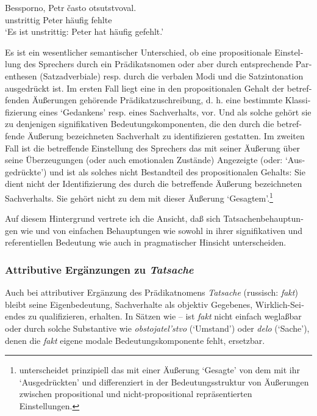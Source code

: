\documentclass[output=paper]{langscibook}
\begin{document}
\begin{otherlanguage}{german}
\begin{exe}
        
     \label{ex:zi83:34'}
        \gll Bessporno, Petr často otsutstvoval. \\
        unstrittig Peter häufig fehlte \\
        \glt ‘Es ist unstrittig: Peter hat häufig gefehlt.’
\end{exe}

\noindent Es ist ein wesentlicher semantischer Unterschied, ob eine propositionale Einstellung des Sprechers durch ein Prädikatsnomen oder aber durch entsprechende Parenthesen (Satzadverbiale) resp. durch die verbalen Modi und die Satzintonation ausgedrückt ist. Im ersten Fall liegt eine in den propositionalen Gehalt der betreffenden Äußerungen gehörende Prädikatzuschreibung, d. h. eine be\-stimm\-te Klassifizierung eines ‘Gedankens’ resp. eines Sachverhalts, vor. Und als solche gehört sie zu denjenigen signifikativen Bedeutungskomponenten, die den durch die betreffende Äußerung bezeichneten Sachverhalt zu identifizieren gestatten. Im zweiten Fall ist die betreffende Einstellung des Sprechers das mit seiner Äußerung über seine Überzeugungen (oder auch emotionalen Zustände) An\-ge\-zeig\-te (oder: ‘Ausgedrückte’) und ist als solches nicht Bestandteil des propositionalen Gehalts: Sie dient nicht der Identifizierung des durch die betreffende Äußerung bezeichneten Sachverhalts. Sie gehört nicht zu dem mit dieser Äu\-ße\-rung ‘Ge\-sag\-tem’.\footnote{\citet{lang1983einstellungsausdrucke-und-ausgedruckte-einstellungen} unterscheidet prinzipiell das mit einer Äußerung ‘Gesagte’ von dem mit ihr ‘Ausgedrückten’ und differenziert in der Bedeutungsstruktur von Äußerungen zwischen propositional und nicht-propositional repräsentierten Einstellungen.}

Auf diesem Hintergrund vertrete ich die Ansicht, daß sich Tatsachenbehauptungen wie  und  von einfachen Behauptungen wie  sowohl in ihrer signifikativen und referentiellen Bedeutung wie auch in pragmatischer Hinsicht unterscheiden.

\subsubsection{Attributive Ergänzungen zu \textit{Tatsache}} \label{sec:zi83:3.4.4}

Auch bei attributiver Ergänzung des Prädikatnomens \textit{Tatsache} (russisch: \textit{fakt}) bleibt seine Eigenbedeutung, Sachverhalte als objektiv Gegebenes, Wirklich-Sei\-en\-des zu qualifizieren, erhalten. In Sätzen wie -- ist \textit{fakt} nicht einfach weglaßbar oder durch solche Substantive wie \textit{obstojatel’stvo} (‘Umstand’) oder \textit{delo} (‘Sache’), denen die \textit{fakt} eigene modale Bedeutungskomponente fehlt, ersetzbar.


\end{otherlanguage}
\end{document}
